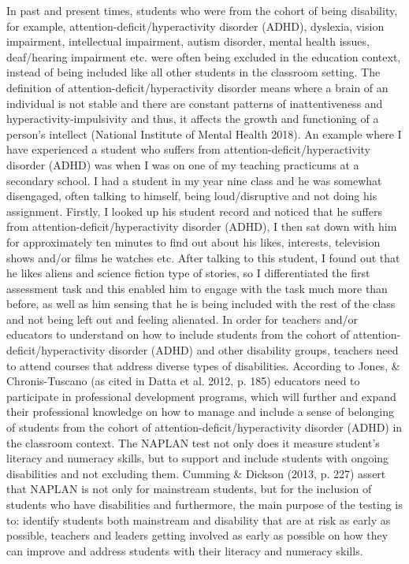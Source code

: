 \documentclass[twoside,14pt,a4paper,notitlepage]{memoir}
\begin{document}
In past and present times, students who were from the cohort of being disability, for example, attention-deficit/hyperactivity disorder (ADHD), dyslexia, vision impairment, intellectual impairment, autism disorder, mental health issues, deaf/hearing impairment etc. were often being excluded in the education context, instead of being included like all other students in the classroom setting. The definition of attention-deficit/hyperactivity disorder means where a brain of an individual is not stable and there are constant patterns of inattentiveness and hyperactivity-impulsivity and thus, it affects the growth and functioning of a person’s intellect (National Institute of Mental Health 2018). An example where I have experienced a student who suffers from attention-deficit/hyperactivity disorder (ADHD) was when I was on one of my teaching practicums at a secondary school. I had a student in my year nine class and he was somewhat disengaged, often talking to himself, being loud/disruptive and not doing his assignment. Firstly, I looked up his student record and noticed that he suffers from attention-deficit/hyperactivity disorder (ADHD), I then sat down with him for approximately ten minutes to find out about his likes, interests, television shows and/or films he watches etc. After talking to this student, I found out that he likes aliens and science fiction type of stories, so I differentiated the first assessment task and this enabled him to engage with the task much more than before, as well as him sensing that he is being included with the rest of the class and not being left out and feeling alienated. In order for teachers and/or educators to understand on how to include students from the cohort of attention-deficit/hyperactivity disorder (ADHD) and other disability groups, teachers need to attend courses that address diverse types of disabilities. According to Jones, \& Chronis-Tuscano (as cited in Datta et al. 2012, p. 185) educators need to participate in professional development programs, which will further and expand their professional knowledge on how to manage and include a sense of belonging of students from the cohort of attention-deficit/hyperactivity disorder (ADHD) in the classroom context. The NAPLAN test not only does it measure student’s literacy and numeracy skills, but to support and include students with ongoing disabilities and not excluding them. Cumming \& Dickson (2013, p. 227) assert that NAPLAN is not only for mainstream students, but for the inclusion of students who have disabilities and furthermore, the main purpose of the testing is to: identify students both mainstream and disability that are at risk as early as possible, teachers and leaders getting involved as early as possible on how they can improve and address students with their literacy and numeracy skills.
\end{document}
